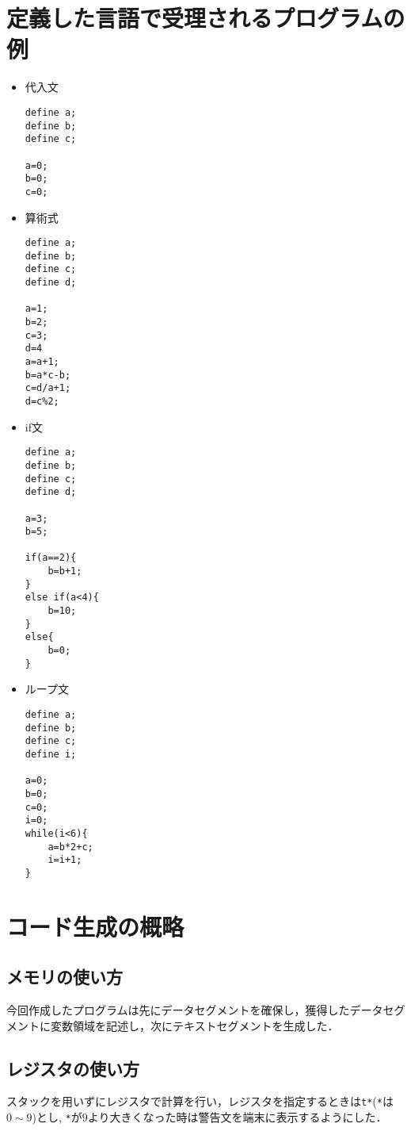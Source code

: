 \documentclass{jarticle}[11pt]
\begin{document}
\section{定義した言語で受理されるプログラムの例}
\begin{itemize}
\item 代入文
\begin{verbatim}
define a;
define b;
define c;

a=0; 
b=0;
c=0;
\end{verbatim}

\item 算術式
\begin{verbatim}
define a;
define b;
define c;
define d;

a=1; 
b=2;
c=3;
d=4
a=a+1;
b=a*c-b;
c=d/a+1;
d=c%2;
\end{verbatim}

\item if文
\begin{verbatim}
define a;
define b;
define c;
define d;

a=3; 
b=5;

if(a==2){
    b=b+1;
}
else if(a<4){
    b=10;
}
else{
    b=0;
}
\end{verbatim}

\item ループ文
\begin{verbatim}
define a;
define b;
define c;
define i;

a=0; 
b=0;
c=0;
i=0;
while(i<6){
    a=b*2+c;
    i=i+1;
}
\end{verbatim}
\end{itemize}

\section{コード生成の概略}
\subsection{メモリの使い方}
今回作成したプログラムは先にデータセグメントを確保し，獲得したデータセグメントに変数領域を記述し，次にテキストセグメントを生成した．
\subsection{レジスタの使い方}
スタックを用いずにレジスタで計算を行い，レジスタを指定するときは\verb|t*|(\verb|*|は$0\sim9$)とし, \verb|*|が$9$より大きくなった時は警告文を端末に表示するようにした．
\end{document}
